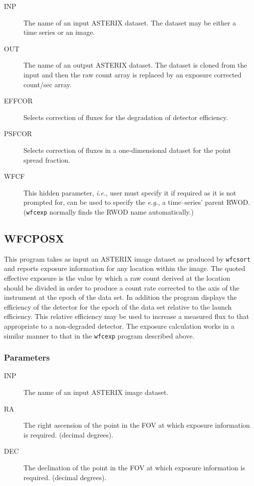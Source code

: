 \begin{description}

\item[INP]
The name of an input ASTERIX dataset. The dataset may be either a time series
or an image.

\item[OUT]
The name of an output ASTERIX dataset. The dataset is cloned from the input and 
then the raw count array is replaced by an exposure corrected 
count/sec array.

\item[EFFCOR]
Selects correction of fluxes for the degradation of detector efficiency.

\item[PSFCOR]
Selects correction of fluxes in a one-dimensional dataset for the point
spread fraction.

\item[WFCF]
This hidden parameter, {\em i.e.}, user must specify it if
required as it is not prompted for, can be used to specify the {\em e.g.}, 
a time--series' parent RWOD.  ({\tt wfcexp} normally finds the RWOD name
automatically.)

\end{description}

\subsection{WFCPOSX}
\label{sec:programs:wfcposx}

This program takes as input an ASTERIX image dataset as produced by
{\tt wfcsort} and reports exposure information for any location within
the image.  The quoted effective exposure is the value by which a raw
count derived at the location should be divided in order to produce a
count rate corrected to the axis of the instrument at the epoch of the
data set.  In addition the program displays the efficiency of the
detector for the epoch of the data set relative to the launch
efficiency. This relative efficiency may be used to increase a measured
flux to that appropriate to a non-degraded detector. The exposure
calculation works in a similar manner to that in the {\tt wfcexp}
program described above.

\subsubsection{Parameters}

\begin{description}

\item[INP]
The name of an input ASTERIX image dataset.

\item[RA]
The right ascension of the point in the FOV at which exposure information
is required. (decimal degrees).

\item[DEC]
The declination of the point in the FOV at which exposure information
is required. (decimal degrees).

\end{description}

